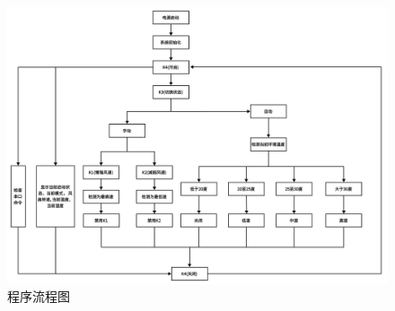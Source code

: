 \begin{figure}[htbp]
  \centering
  \includegraphics[width=\textwidth]{../figures/program-gra.png}
  \caption{程序流程图}
  \label{fig:1}
\end{figure}